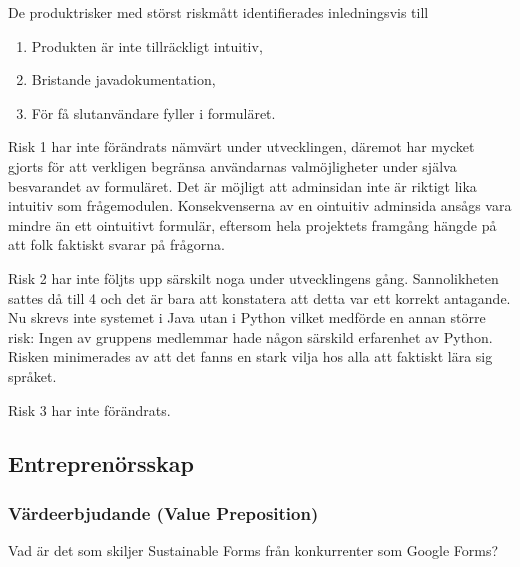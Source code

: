 \documentclass[12pt]{article}
\begin{document}
De produktrisker med störst riskmått identifierades inledningsvis till 

\begin{enumerate}
    \item Produkten är inte tillräckligt intuitiv,
    \item Bristande javadokumentation,
    \item För få slutanvändare fyller i formuläret.
\end{enumerate}

Risk 1 har inte förändrats nämvärt under utvecklingen, däremot har mycket gjorts för att verkligen begränsa användarnas valmöjligheter under själva besvarandet av formuläret. Det är möjligt att adminsidan inte är riktigt lika intuitiv som frågemodulen. Konsekvenserna av en ointuitiv adminsida ansågs vara mindre än ett ointuitivt formulär, eftersom hela projektets framgång hängde på att folk faktiskt svarar på frågorna. 

Risk 2 har inte följts upp särskilt noga under utvecklingens gång. Sannolikheten sattes då till 4 och det är bara att konstatera att detta var ett korrekt antagande. Nu skrevs inte systemet i Java utan i Python vilket medförde en annan större risk: Ingen av gruppens medlemmar hade någon särskild erfarenhet av Python. Risken minimerades av att det fanns en stark vilja hos alla att faktiskt lära sig språket.

Risk 3 har inte förändrats. 

\subsection{Entreprenörsskap}

\subsubsection{Värdeerbjudande (Value Preposition)}

Vad är det som skiljer Sustainable Forms från konkurrenter som Google Forms?


\end{document}
